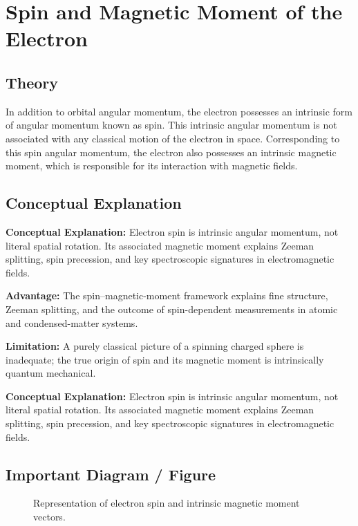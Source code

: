 \documentclass[12pt]{report}
\begin{document}
\section{Spin and Magnetic Moment of the Electron}



\subsection*{Theory}

In addition to orbital angular momentum, the electron possesses an intrinsic form of angular momentum known as spin. This intrinsic angular momentum is not associated with any classical motion of the electron in space. Corresponding to this spin angular momentum, the electron also possesses an intrinsic magnetic moment, which is responsible for its interaction with magnetic fields.


\subsection{Conceptual Explanation}
\textbf{Conceptual Explanation:} Electron spin is intrinsic angular momentum, not literal spatial rotation. Its associated magnetic moment explains Zeeman splitting, spin precession, and key spectroscopic signatures in electromagnetic fields.


\textbf{Advantage:} The spin--magnetic-moment framework explains fine structure, Zeeman splitting, and the outcome of spin-dependent measurements in atomic and condensed-matter systems.

\textbf{Limitation:} A purely classical picture of a spinning charged sphere is inadequate; the true origin of spin and its magnetic moment is intrinsically quantum mechanical.

\textbf{Conceptual Explanation:} Electron spin is intrinsic angular momentum, not literal spatial rotation. Its associated magnetic moment explains Zeeman splitting, spin precession, and key spectroscopic signatures in electromagnetic fields.

\subsection*{Important Diagram / Figure}

\begin{figure}[H]
    \centering
    \caption{Representation of electron spin and intrinsic magnetic moment vectors.}
\end{figure}
\end{document}
